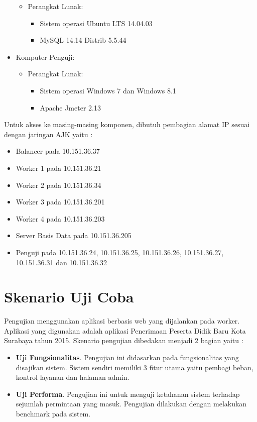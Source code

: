 \documentclass{ta-its}
\begin{document}
\begin{itemize}
\begin{itemize}
\begin{itemize}
					\end{itemize}
					\item Perangkat Lunak:
					\begin{itemize}
						\item Sistem operasi Ubuntu LTS 14.04.03
						\item MySQL 14.14 Distrib 5.5.44
					\end{itemize}
				\end{itemize}
				\item Komputer Penguji:
				\begin{itemize}
					\item Perangkat Lunak:
					\begin{itemize}
						\item Sistem operasi Windows 7 dan Windows 8.1
						\item Apache Jmeter 2.13
					\end{itemize}
				\end{itemize}
				
			\end{itemize}
			
			Untuk akses ke masing-masing komponen, dibutuh pembagian alamat IP sesuai dengan jaringan AJK yaitu :
			
			\begin{itemize}
				\item Balancer pada 10.151.36.37
				\item Worker 1 pada 10.151.36.21
				\item Worker 2 pada 10.151.36.34
				\item Worker 3 pada 10.151.36.201
				\item Worker 4 pada 10.151.36.203
				\item Server Basis Data pada 10.151.36.205
				\item Penguji pada 10.151.36.24, 10.151.36.25, 10.151.36.26, 10.151.36.27,
				10.151.36.31 dan 10.151.36.32
			\end{itemize}
			
		\section{Skenario Uji Coba}
			Pengujian menggunakan aplikasi berbasis web yang dijalankan pada worker. Aplikasi yang digunakan adalah aplikasi Penerimaan Peserta Didik Baru Kota Surabaya tahun 2015. Skenario pengujian dibedakan menjadi 2 bagian yaitu :
			\begin{itemize}
				\item \textbf{Uji Fungsionalitas}. Pengujian ini didasarkan pada fungsionalitas yang disajikan sistem. Sistem sendiri memiliki 3 fitur utama yaitu pembagi beban, kontrol layanan dan halaman admin.
				\item \textbf{Uji Performa}. Pengujian ini untuk menguji ketahanan sistem terhadap sejumlah permintaan yang masuk. Pengujian dilakukan dengan melakukan benchmark pada sistem.
			\end{itemize}
			
\end{document}
